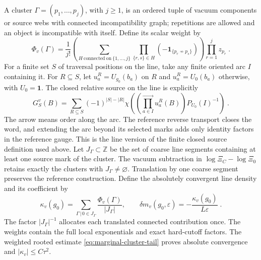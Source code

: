 \documentclass[11pt]{article}
\newcommand{\id}{\mathbf 1}
\begin{document}
A cluster $\Gamma=(p_1,\ldots,p_j)$, with $j\geq 1$, is an ordered tuple of vacuum components or source webs with connected incompatibility graph; repetitions are allowed and an object is incompatible with itself. Define its scalar weight by
\begin{equation}\label{eq:marginal-cluster-weight}
    \Phi_v(\Gamma)=\frac{1}{j!}
        \left(\sum_{H\ \mathrm{connected\ on}\ \{1,\ldots,j\}}
            \prod_{\{r,s\}\in H}(-\mathbf1_{\{p_r\not \sim p_s\}})\right)
        \prod_{r=1}^j z_{p_r}\;.
\end{equation}
For a finite set $S$ of traversal positions on the line, take any finite oriented arc $I$ containing it. For $R\subseteq S$, let $u_a^R=U_{g_0}(b_a)$ on $R$ and $u_a^R=U_0(b_a)$ otherwise, with $U_0=\id$. The closed relative source on the line is explicitly
\begin{equation}\label{eq:marginal-line-source}
    G_S^v(B)=\sum_{R\subseteq S}(-1)^{|S|-|R|}
        \chi\left(\left(\prod_{a\in I}^{\longrightarrow}u_a^R(B)\right)
            P_{U_0}(I)^{-1}\right)\;.
\end{equation}
The arrow means order along the arc. The reference reverse transport closes the word, and extending the arc beyond its selected marks adds only identity factors in the reference gauge. This is the line version of the finite closed source definition used above. Let $J_\Gamma\subset \mathbb Z$ be the set of coarse line segments containing at least one source mark of the cluster. The vacuum subtraction in $\log\Xi_C-\log\Xi_0$ retains exactly the clusters with $J_\Gamma\ne \varnothing$. Translation by one coarse segment preserves the reference construction. Define the absolutely convergent line density and its coefficient by
\begin{equation}\label{eq:marginal-full-perimeter}
    \boxed{\displaystyle
        \kappa_v(g_0)=\sum_{\Gamma\, | \,0\in J_\Gamma}
                    \frac{\Phi_v(\Gamma)}{|J_\Gamma|},
        \qquad \delta m_v(g_0,\varepsilon)
            =-\frac{\kappa_v(g_0)}{L\varepsilon}}
        \;.
\end{equation}
The factor $|J_\Gamma|^{-1}$ allocates each translated connected contribution once. The weights contain the full local exponentials and exact hard-cutoff factors. The weighted rooted estimate \eqref{eq:marginal-cluster-tail} proves absolute convergence and $|\kappa_v|\leq C\tau^2$.
\end{document}
